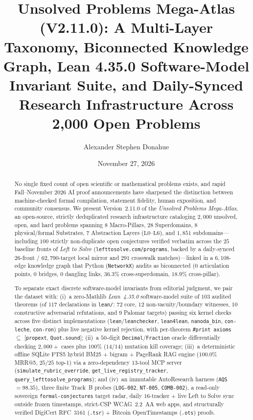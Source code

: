 \documentclass[11pt,reqno]{amsart}
\title[Unsolved Problems Mega-Atlas (V2.11.0)]{Unsolved Problems Mega-Atlas (V2.11.0): A Multi-Layer Taxonomy, Biconnected Knowledge Graph, Lean 4.35.0 Software-Model Invariant Suite, and Daily-Synced Research Infrastructure Across 2,000 Open Problems}
\author{Alexander Stephen Donahue}
\date{November 27, 2026}
\theoremstyle{plain}
\theoremstyle{definition}
\newcommand{\code}[1]{{\footnotesize\nolinkurl{#1}}}
\begin{document}
\begin{abstract}
No single fixed count of open scientific or mathematical problems exists, and rapid Fall--November 2026 AI proof announcements have sharpened the distinction between machine-checked formal compilation, statement fidelity, human exposition, and community consensus. We present Version~2.11.0 of the \emph{Unsolved Problems Mega-Atlas}, an open-source, strictly deduplicated research infrastructure cataloging $2{,}000$ unsolved, open, and hard problems spanning $8$ Macro-Pillars, $28$ Superdomains, $8$ physical/formal Substrates, $7$ Abstraction Layers ($\text{L0}$--$\text{L6}$), and $1{,}851$ subdomains---including $100$ strictly non-duplicate open conjectures verified verbatim across the $25$ baseline fronts of \emph{Left to Solve} (\code{lefttosolve.com/programs}, backed by a daily-synced $26$-front / $62{,}790$-target local mirror and $291$ crosswalk matches)---linked in a $6{,}108$-edge knowledge graph that Python (\code{NetworkX}) audits as biconnected ($0$ articulation points, $0$ bridges, $0$ dangling links, $36.3\%$ cross-superdomain, $18.9\%$ cross-pillar).

To separate exact discrete software-model invariants from editorial judgment, we pair the dataset with: (i)~a zero-Mathlib \emph{Lean~4.35.0} software-model suite of $103$ audited theorems (of $117$ declarations in \code{lean/}: $72$ core, $12$ non-vacuity/boundary witnesses, $10$ constructive adversarial refutations, and $9$ Palomar targets) passing six kernel checks across five distinct implementations (\code{lean}/\code{leanchecker}, \code{lean4lean}, \code{nanoda_bin}, \code{con-leche}, \code{con-ron}) plus live negative kernel rejection, with per-theorem {\footnotesize\texttt{\#print axioms}} $\subseteq$ [\code{propext}, \code{Quot.sound}]; (ii)~a $50$-digit \code{Decimal}/\code{Fraction} oracle differentially checking $2{,}000+$ cases plus $100\%$ ($14/14$) mutation kill coverage; (iii)~a deterministic offline SQLite FTS5 hybrid BM25 + bigram + PageRank RAG engine ($100.0\%$ MRR@5, $25/25$ top-1) via a zero-dependency $13$-tool MCP server (\code{simulate_rubric_override}, \code{get_live_registry_tracker}, \code{query_lefttosolve_programs}); and (iv)~an immutable AutoResearch harness (\code{AQS} $= 98.35$), three finite Track~B probes (\code{LOG-002}, \code{NT-005}, \code{COMB-002}), a read-only sovereign \code{formal-conjectures} target radar, daily $16$-tracker + live Left to Solve sync outside frozen timestamps, strict-CSP WCAG~2.2~AA web apps, and structurally verified DigiCert RFC~3161 (\code{.tsr}) + Bitcoin OpenTimestamps (\code{.ots}) proofs.


\end{abstract}
\end{document}
